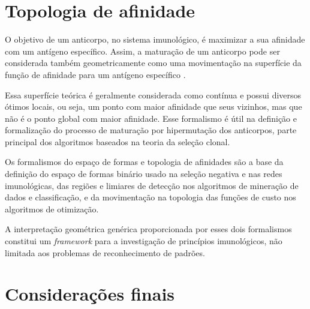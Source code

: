 \section{Topologia de afinidade}

O objetivo de um anticorpo, no sistema imunológico, é maximizar a sua afinidade com um antígeno específico. Assim, a maturação de um anticorpo pode ser considerada também geometricamente como uma movimentação na superfície da função de afinidade para um antígeno específico \cite{Brownlee2007}.

Essa superfície teórica é geralmente considerada como contínua e possui diversos ótimos locais, ou seja, um ponto com maior afinidade que seus vizinhos, mas que não é o ponto global com maior afinidade. Esse formalismo é útil na definição e formalização do processo de maturação por hipermutação dos anticorpos, parte principal dos algoritmos baseados na teoria da seleção clonal.

Os formalismos do espaço de formas e topologia de afinidades são a base da definição do espaço de formas binário usado na seleção negativa e nas redes imunológicas, das regiões e limiares de detecção nos algoritmos de mineração de dados e classificação, e da movimentação na topologia das funções de custo nos algoritmos de otimização.

A interpretação geométrica genérica proporcionada por esses dois formalismos constitui um \emph{framework} para a investigação de princípios imunológicos, não limitada aos problemas de reconhecimento de padrões.

\section{Considerações finais}

